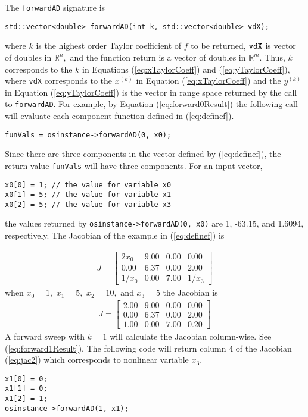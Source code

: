 \documentclass[11pt]{article}
\renewcommand{\_}{{\char"5F}}
\renewcommand{\{}{{\char"7B}}
\renewcommand{\}}{{\char"7D}}
\renewcommand{\^}{{\char"0D}}
\renewcommand{\'}{{\char"0D}}
\begin{document}
The {\tt forwardAD} signature is
\begin{verbatim}
std::vector<double> forwardAD(int k, std::vector<double> vdX);
\end{verbatim}
where $k$ is the highest order Taylor coefficient of $f$ to be returned,  $\tt vdX$ is vector of doubles in $ \mathbb{R}^{n},$ and the function return is a vector of doubles in $ \mathbb{R}^{m}.$  Thus, $k$ corresponds to the $k$ in Equations  (\ref{eq:xTaylorCoeff}) and (\ref{eq:yTaylorCoeff}),  where {\tt vdX} corresponds to the $x^{(k)}$ in Equation (\ref{eq:xTaylorCoeff}) and the $y^{(k)}$ in Equation (\ref{eq:yTaylorCoeff}) is the vector in range space returned by the call to {\tt  forwardAD}.    For example, by  Equation (\ref{eq:forward0Result}) the following call will evaluate each component function defined in (\ref{eq:definef}).
\begin{verbatim}
funVals = osinstance->forwardAD(0, x0);
\end{verbatim}
Since there are three components in the vector defined by  (\ref{eq:definef}), the return value  {\tt funVals} will have three components. For an input vector, 
\begin{verbatim}
x0[0] = 1; // the value for variable x0
x0[1] = 5; // the value for variable x1
x0[2] = 5; // the value for variable x3
\end{verbatim}
the values returned by {\tt osinstance->forwardAD(0, x0)}  are 1, -63.15, and 1.6094, respectively.
The Jacobian of the example in (\ref{eq:definef}) is

\begin{eqnarray}
J =
\left[
\begin{array}{rrrr}
2x_{0} &9.00&0.00&0.00   \\
0.00&6.37&0.00&2.00 \\
1/x_{0}&0.00&7.00&1/x_{3} 
\end{array}
\right] \label{eq:jac}
\end{eqnarray}
when $x_{0} = 1,$ $x_{1} = 5,$ $x_{2} = 10,$ and $x_{3} = 5$ the Jacobian is
\begin{eqnarray}
J =
\left[
\begin{array}{rrrr}
2.00 &9.00&0.00&0.00   \\
0.00&6.37&0.00&2.00 \\
1.00&0.00&7.00&0.20 
\end{array}
\right] \label{eq:jac2}
\end{eqnarray}
A forward sweep with $k = 1$ will calculate the Jacobian column-wise.  See 
(\ref{eq:forward1Result}).  The following code will return column 4 of the Jacobian (\ref{eq:jac2}) which corresponds to nonlinear variable $x_{3}.$ 
\begin{verbatim}
x1[0] = 0;
x1[1] = 0;
x1[2] = 1;
osinstance->forwardAD(1, x1);
\end{verbatim}
\end{document}
